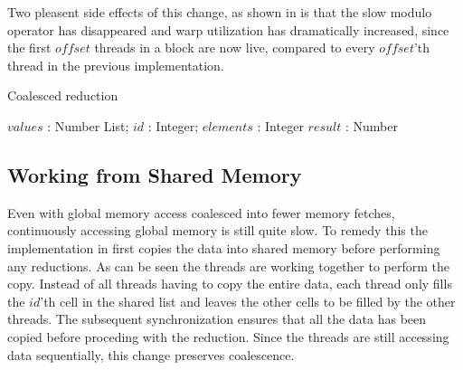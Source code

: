 
Two pleasent side effects of this change, as shown in
 is that the slow modulo operator has
disappeared and warp utilization has dramatically increased, since the
first $offset$ threads in a block are now live, compared to every
$offset$'th thread in the previous implementation.

\begin{algorithm}
  \caption{Coalesced reduction}
  \label{alg:coalescedReduct}
  \begin{algorithmic}
              {$values$ : Number List; $id$ : Integer; $elements$ : Integer}
              {$result$ : Number}
              {
                  \ENDIF
                  \SYNC
                \ENDWHILE
                \ENDIF
              }
  \end{algorithmic}
\end{algorithm}



\subsection{Working from Shared Memory}

Even with global memory access coalesced into fewer memory fetches,
continuously accessing global memory is still quite slow. To remedy
this the implementation in  first copies the
data into shared memory before performing any reductions. As can be
seen the threads are working together to perform the copy. Instead of
all threads having to copy the entire data, each thread only fills the
$id$'th cell in the shared list and leaves the other cells to be
filled by the other threads. The subsequent synchronization ensures
that all the data has been copied before proceding with the
reduction. Since the threads are still accessing data sequentially,
this change preserves coalescence.

